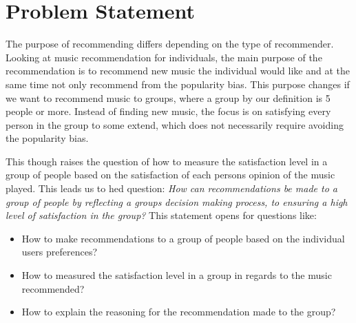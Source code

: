 \section{Problem Statement}
The purpose of recommending differs depending on the type of recommender. Looking at music recommendation for individuals, the main purpose of the recommendation is to recommend new music the individual would like and at the same time not only recommend from the popularity bias. This purpose changes if we want to recommend music to groups, where a group by our definition is 5 people or more. Instead of finding new music, the focus is on satisfying every person in the group to some extend, which does not necessarily require avoiding the popularity bias. 

This though raises the question of how to measure the satisfaction level in a group of people based on the satisfaction of each persons opinion of the music played. This leads us to hed question: 
\textit{How can recommendations be made to a group of people by reflecting a groups decision making process, to ensuring a high level of satisfaction in the group?} This statement opens for questions like:
\begin{itemize}
\item How to make recommendations to a group of people based on the individual users preferences?
\item How to measured the satisfaction level in a group in regards to the music recommended?
\item How to explain the reasoning for the recommendation made to the group? 
\end{itemize}